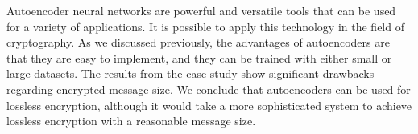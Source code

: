 
Autoencoder neural networks are powerful and versatile tools that can be used for a variety of applications. It is possible to apply this technology in the field of cryptography. As we discussed previously, the advantages of autoencoders are that they are easy to implement, and they can be trained with either small or large datasets. The results from the case study show significant drawbacks regarding encrypted message size. We conclude that autoencoders can be used for lossless encryption, although it would take a more sophisticated system to achieve lossless encryption with a reasonable message size.
